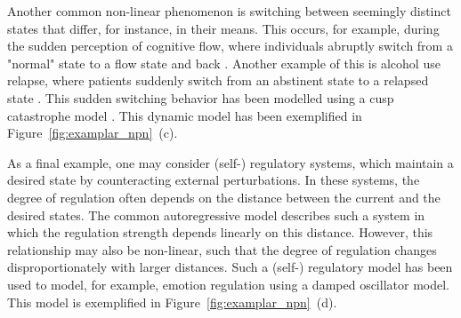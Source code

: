 \documentclass[man, floatsintext]{apa7}
\begin{document}
Another common non-linear phenomenon is switching between seemingly distinct
states that differ, for instance, in their means. This occurs, for example,
during the sudden perception of cognitive flow, where individuals abruptly
switch from a "normal" state to a flow state and back
\parencite{ceja_suddenly_2012}. Another example of this is alcohol use relapse,
where patients suddenly switch from an abstinent state to a relapsed state
\parencite{witkiewitz_modeling_2007}. This sudden switching behavior has been
modelled using a cusp catastrophe model
\parencite{van_der_maas_sudden_2003,chow_cusp_2015}. This dynamic model has
been exemplified in Figure~\ref{fig:examplar_npn}~(c).

As a final example, one may consider (self-) regulatory systems, which maintain
a desired state by counteracting external perturbations. In these systems, the
degree of regulation often depends on the distance
between the current and the desired states. The common autoregressive model
describes such a system in which the regulation strength depends linearly on
this distance. However, this relationship may also be non-linear, such that the
degree of regulation changes disproportionately with larger distances. Such a
(self-) regulatory model has been used to model, for example, emotion
regulation \parencite{chow_emotion_2005} using a damped oscillator model. This
model is exemplified in Figure~\ref{fig:examplar_npn}~(d).
\end{document}

